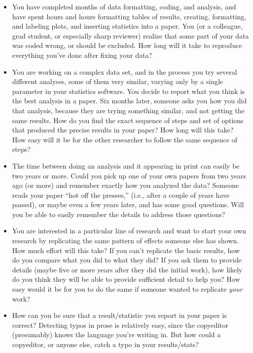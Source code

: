 \documentclass{book}
\begin{document}
\begin{itemize}
\item You have completed months of data formatting, coding, and analysis, and have spent hours and hours formatting tables of results, creating, formatting, and labeling plots, and inserting statistics into a paper. You (or a colleague, grad student, or especially sharp reviewer) realize that some part of your data was coded wrong, or should be excluded.  How long will it take to reproduce everything you've done after fixing your data?
\item You are working on a complex data set, and in the process you try several different analyses, some of them very similar, varying only by a single parameter in your statistics software.  You decide to report what you think is the best analysis in a paper. Six months later, someone asks you how you did that analysis, because they are trying something similar, and not getting the same results. How do you find the exact sequence of steps and set of options that produced the precise results in your paper? How long will this take? How easy will it be for the other researcher to follow the same sequence of steps?
\item The time between doing an analysis and it appearing in print can easily be two years or more.  Could you pick up one of your own papers from two years ago (or more) and remember exactly how you analyzed the data?  Someone reads your paper ``hot off the presses,'' (i.e., after a couple of years have passed), or maybe even a few years later, and has some good questions.  Will you be able to easily remember the details to address those questions?
\item You are interested in a particular line of research and want to start your own research by replicating the same pattern of effects someone else has shown. How much effort will this take? If you can't replicate the basic results, how do you compare what you did to what they did?  If you ask them to provide details (maybe five or more years after they did the initial work), how likely do you think they will be able to provide sufficient detail to help you?  How easy would it be for you to do the same if someone wanted to replicate \emph{your} work?
\item How can you be sure that a result/statistic you report in your paper is correct? Detecting typos in prose is relatively easy, since the copyeditor (presumably) knows the language you're writing in. But how could a copyeditor, or anyone else, catch a typo in your results/stats?

\end{itemize}
\end{document}
